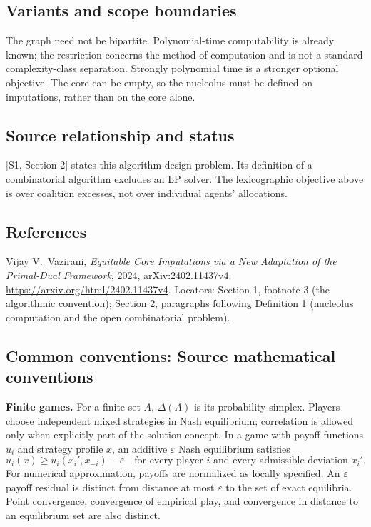 \documentclass[11pt,a4paper]{article}
\begin{document}
\subsection*{Variants and scope boundaries}
The graph need not be bipartite. Polynomial-time computability is already
known; the restriction concerns the method of computation and is not
a standard complexity-class separation. Strongly polynomial time is a
stronger optional objective. The core can be empty, so the nucleolus
must be defined on imputations, rather than on the core alone.

\subsection*{Source relationship and status}
[S1, Section 2] states this algorithm-design problem.
Its definition of a combinatorial algorithm excludes an LP solver.
The lexicographic objective above is over coalition excesses, not
over individual agents' allocations.

\subsection*{References}
\begingroup\footnotesize\raggedright
\noindent[S1] Vijay V.~Vazirani,
\emph{Equitable Core Imputations via a New Adaptation of the
Primal-Dual Framework}, 2024, arXiv:2402.11437v4.
\url{https://arxiv.org/html/2402.11437v4}.
Locators: Section 1, footnote 3 (the algorithmic convention);
Section 2, paragraphs following Definition 1 (nucleolus computation
and the open combinatorial problem).
\par\endgroup

\subsection*{Common conventions: Source mathematical conventions}

\textbf{Finite games.} For a finite set $A$, $\Delta(A)$ is its probability
simplex. Players choose independent mixed strategies in Nash equilibrium;
correlation is allowed only when explicitly part of the solution concept.
In a game with payoff functions $u_i$ and strategy profile $x$, an additive
$\varepsilon$ Nash equilibrium satisfies
\[
 u_i(x)\geq u_i(x_i',x_{-i})-\varepsilon
 \quad\text{for every player $i$ and every admissible deviation $x_i'$}.
\]
For numerical approximation, payoffs are normalized as locally specified.
An $\varepsilon$ payoff residual is distinct from distance at most
$\varepsilon$ to the set of exact equilibria. Point convergence, convergence
of empirical play, and convergence in distance to an equilibrium set are
also distinct.
\end{document}
